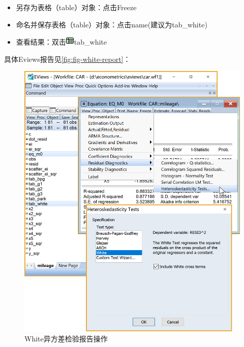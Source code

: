 \documentclass[12pt,(landscape,a4paper),(portrait,a4paper)]{article}
\providecommand{\tightlist}{%
  \setlength{\itemsep}{0pt}\setlength{\parskip}{0pt}}
\begin{document}
\begin{itemize}
\begin{enumerate}
    \begin{itemize}
    \tightlist
    \item
      另存为表格（table）对象：点击Freeze
    \item
      命名并保存表格（table）对象：点击name(建议为tab\_white)
    \item
      查看结果：双击\includegraphics{picture/object/Table.png}tab\_white
    \end{itemize}
  \end{enumerate}
\end{itemize}

具体Eviews报告见\ref{fig:fig-white-report}：

\begin{figure}

{\centering \includegraphics[width=24.1in]{picture/lab6-heteroskedasticity/4-test-white1} 

}

\caption{White异方差检验报告操作}\label{fig:fig-white-test}
\end{figure}
\end{document}

